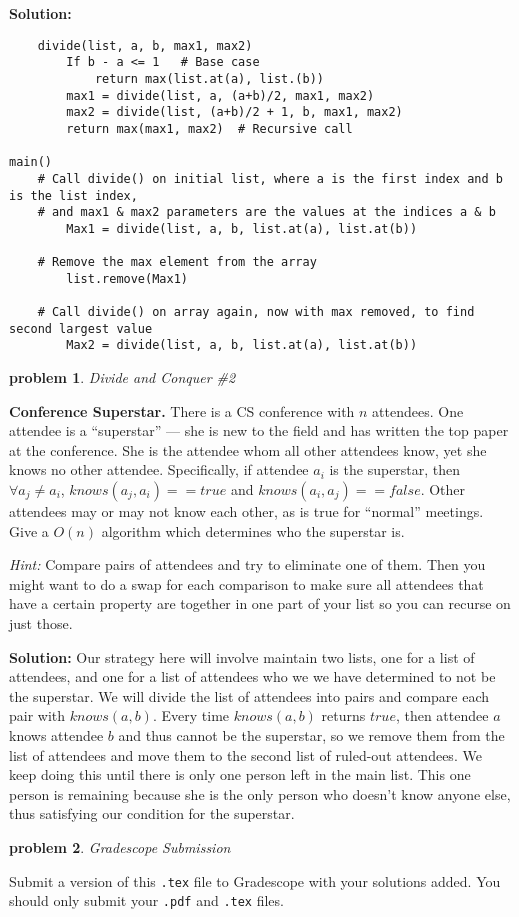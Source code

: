 \documentclass[10pt]{article}
\newtheorem{problem}{\sc\color{cit}problem}
\begin{document}
	\textbf{Solution:}
	\begin{verbatim}
	divide(list, a, b, max1, max2)
	    If b - a <= 1   # Base case
	        return max(list.at(a), list.(b))
	    max1 = divide(list, a, (a+b)/2, max1, max2)
	    max2 = divide(list, (a+b)/2 + 1, b, max1, max2)
	    return max(max1, max2)  # Recursive call
	    
main()
    # Call divide() on initial list, where a is the first index and b is the list index,
    # and max1 & max2 parameters are the values at the indices a & b
	    Max1 = divide(list, a, b, list.at(a), list.at(b))
	    
    # Remove the max element from the array
    	list.remove(Max1)
    	
    # Call divide() on array again, now with max removed, to find second largest value
	    Max2 = divide(list, a, b, list.at(a), list.at(b))

	\end{verbatim}
	
 \begin{problem} Divide and Conquer \#2\end{problem}

\noindent
\textbf{Conference Superstar.}  There is a CS conference with $n$ attendees. One attendee is a ``superstar'' --- she is new to the field and has written the top paper at the conference.  She is the attendee whom all other attendees know, yet she knows no other attendee.  Specifically, if attendee $a_i$ is the superstar, then $\forall a_j \neq a_i$, $knows(a_j, a_i) == true$ and $knows(a_i, a_j) == false$.  Other attendees may or may not know each other, as is true for ``normal'' meetings.  Give a $O(n)$ algorithm which determines who the superstar is.

\emph{Hint:} Compare pairs of attendees and try to eliminate one of them. Then you might  want to do a swap for each comparison to make sure all attendees that have a certain property are together in one part of your list so you can recurse on just those.      
      
\textbf{Solution:}  Our strategy here will involve maintain two lists, one for a list of attendees, and one for a list of attendees who we we have determined to not be the superstar. We will divide the list of attendees into pairs and compare each pair with $knows(a, b)$. Every time $knows(a, b)$ returns $true$, then attendee $a$ knows attendee $b$ and thus cannot be the superstar, so we remove them from the list of attendees and move them to the second list of ruled-out attendees. We keep doing this until there is only one person left in the main list. This one person is remaining because she is the only person who doesn't know anyone else, thus satisfying our condition for the superstar.
      

\begin{problem} Gradescope Submission \end{problem}
Submit a version of this \verb|.tex| file to Gradescope with your solutions added.  You should only submit your \verb|.pdf| and \verb|.tex| files.

%
%
\end{document}
